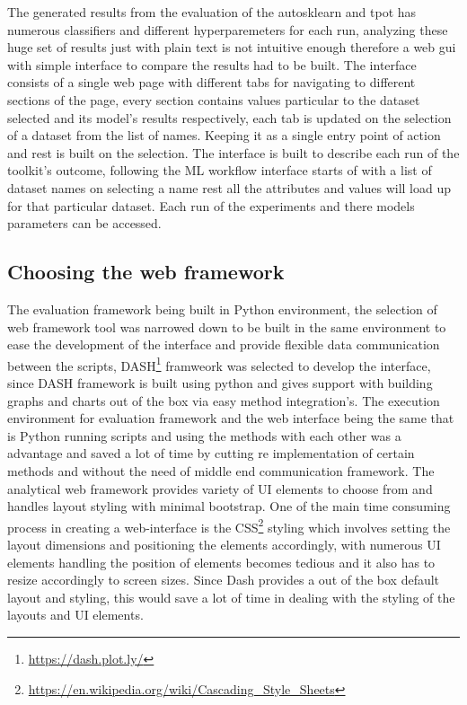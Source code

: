 The generated results from the evaluation of the autosklearn and tpot has numerous classifiers and different hyperparemeters for each run, analyzing these huge set of results just with plain text is not intuitive enough therefore a web gui with simple interface to compare the results had to be built. The interface consists of a single web page with different tabs for navigating to different sections of the page, every section contains values particular to the dataset selected and its model's results respectively, each tab is updated on the selection of a dataset from the list of names.
Keeping it as a single entry point of action and rest is built on the selection. The interface is built to describe each run of the toolkit's outcome, following the ML workflow interface starts of with a list of dataset names on selecting a name rest all the attributes and values will load up for that particular dataset. Each run of the experiments and there models parameters can be accessed.

\subsection{Choosing the web framework}
The evaluation framework being built in Python environment, the selection of web framework tool was narrowed down to be built in the same environment to ease the development of the interface and provide flexible data communication between the scripts, DASH\footnote{\url{https://dash.plot.ly/}} framweork was selected to develop the interface, since DASH framework is built using python and gives support with building graphs and charts out of the box via easy method integration's. The execution environment for evaluation framework and the web interface being the same that is Python running scripts and using the methods with each other was a advantage and saved a lot of time by cutting re implementation of certain methods and without the need of middle end communication framework. The analytical web framework provides variety of UI elements to choose from and handles layout styling with minimal bootstrap. One of the main time consuming process in creating a web-interface is the CSS\footnote{\url{https://en.wikipedia.org/wiki/Cascading_Style_Sheets}} styling which involves setting the layout dimensions and positioning the elements accordingly, with numerous UI elements handling the position of elements becomes tedious and it also has to resize accordingly to screen sizes. Since Dash provides a out of the box default layout and styling, this would save a lot of time in dealing with the styling of the layouts and UI elements.

